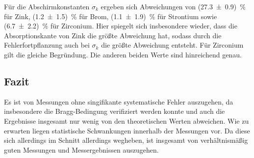 \noindent
Für die Abschirmkonstanten $\sigma_k$ ergeben sich Abweichungen von (\num[]{27.3 +- 0.9}) \,\% für Zink,
(\num[]{1.2 +- 1.5}) \,\% für Brom, (\num[]{1.1 +- 1.9}) \,\% für Strontium sowie (\num[]{6.7 +- 2.2}) \,\% für Zirconium.
Hier spiegelt sich insbesondere wieder, dass die Absorptionskante von Zink die größte Abweichung hat, sodass durch die Fehlerfortpflanzung auch bei $\sigma_k$
die größte Abweichung entsteht. 
Für Zirconium gilt die gleiche Begründung.
Die anderen beiden Werte sind hinreichend genau.


\subsection{Fazit}%
Es ist von Messungen ohne singifikante systematische Fehler auszugehen, da insbesondere die Bragg-Bedingung verifiziert werden konnte
und auch die Ergebnisse insgesamt nur wenig von den theoretischen Werten abweichen.
Wie zu erwarten liegen statistische Schwankungen innerhalb der Messungen vor.
Da diese sich allerdings im Schnitt allerdings wegheben, ist insgesamt von verhältnismäßig guten Messungen und Messergebnissen auszugehen.
